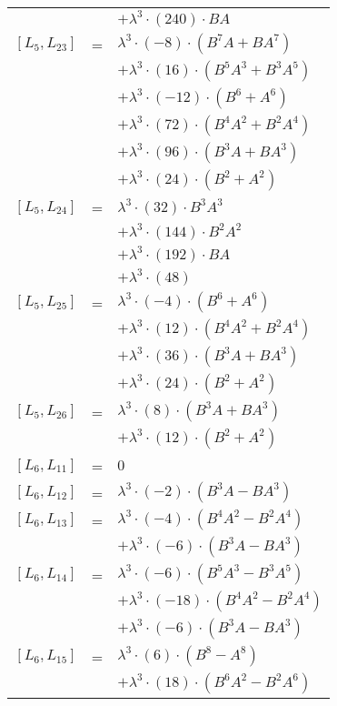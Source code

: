 \documentclass{article}
\begin{document}
\begin{center}
\begin{longtable}{lll}
 & & $ + {\lambda}^3{\cdot}(240){\cdot}BA$ \\
$[L_{5},L_{23}]$ & = & ${\lambda}^3{\cdot}(-8){\cdot}(B^{7}A+BA^{7})$ \\*
 & & $ + {\lambda}^3{\cdot}(16){\cdot}(B^{5}A^{3}+B^{3}A^{5})$ \\*
 & & $ + {\lambda}^3{\cdot}(-12){\cdot}(B^{6}+A^{6})$ \\*
 & & $ + {\lambda}^3{\cdot}(72){\cdot}(B^{4}A^{2}+B^{2}A^{4})$ \\*
 & & $ + {\lambda}^3{\cdot}(96){\cdot}(B^{3}A+BA^{3})$ \\*
 & & $ + {\lambda}^3{\cdot}(24){\cdot}(B^{2}+A^{2})$ \\
$[L_{5},L_{24}]$ & = & ${\lambda}^3{\cdot}(32){\cdot}B^{3}A^{3}$ \\*
 & & $ + {\lambda}^3{\cdot}(144){\cdot}B^{2}A^{2}$ \\*
 & & $ + {\lambda}^3{\cdot}(192){\cdot}BA$ \\*
 & & $ + {\lambda}^3{\cdot}(48)$ \\
$[L_{5},L_{25}]$ & = & ${\lambda}^3{\cdot}(-4){\cdot}(B^{6}+A^{6})$ \\*
 & & $ + {\lambda}^3{\cdot}(12){\cdot}(B^{4}A^{2}+B^{2}A^{4})$ \\*
 & & $ + {\lambda}^3{\cdot}(36){\cdot}(B^{3}A+BA^{3})$ \\*
 & & $ + {\lambda}^3{\cdot}(24){\cdot}(B^{2}+A^{2})$ \\
$[L_{5},L_{26}]$ & = & ${\lambda}^3{\cdot}(8){\cdot}(B^{3}A+BA^{3})$ \\*
 & & $ + {\lambda}^3{\cdot}(12){\cdot}(B^{2}+A^{2})$ \\
$[L_{6},L_{11}]$ & = & $ 0 $ \\
$[L_{6},L_{12}]$ & = & ${\lambda}^3{\cdot}(-2){\cdot}(B^{3}A-BA^{3})$ \\
$[L_{6},L_{13}]$ & = & ${\lambda}^3{\cdot}(-4){\cdot}(B^{4}A^{2}-B^{2}A^{4})$ \\*
 & & $ + {\lambda}^3{\cdot}(-6){\cdot}(B^{3}A-BA^{3})$ \\
$[L_{6},L_{14}]$ & = & ${\lambda}^3{\cdot}(-6){\cdot}(B^{5}A^{3}-B^{3}A^{5})$ \\*
 & & $ + {\lambda}^3{\cdot}(-18){\cdot}(B^{4}A^{2}-B^{2}A^{4})$ \\*
 & & $ + {\lambda}^3{\cdot}(-6){\cdot}(B^{3}A-BA^{3})$ \\
$[L_{6},L_{15}]$ & = & ${\lambda}^3{\cdot}(6){\cdot}(B^{8}-A^{8})$ \\*
 & & $ + {\lambda}^3{\cdot}(18){\cdot}(B^{6}A^{2}-B^{2}A^{6})$ \\*

\end{longtable}
\end{center}
\end{document}
